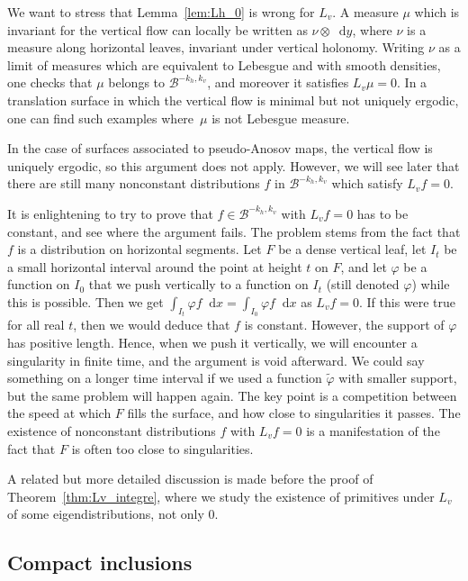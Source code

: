 \documentclass[10pt]{amsart}
\newcommand{\boB}{\mathcal{B}}
\newcommand{\dd}{\mathop{}\!\mathrm{d}}
\let\phi\varphi
\theoremstyle{definition}
\numberwithin{equation}{section}
\begin{document}
We want to stress that Lemma~\ref{lem:Lh_0} is wrong for $L_v$. A measure
$\mu$ which is invariant for the vertical flow can locally be written as
$\nu\otimes \dd y$, where $\nu$ is a measure along horizontal leaves,
invariant under vertical holonomy. Writing $\nu$ as a limit of measures which
are equivalent to Lebesgue and with smooth densities, one checks that $\mu$
belongs to $\boB^{-k_h, k_v}$, and moreover it satisfies $L_v \mu=0$. In a
translation surface in which the vertical flow is minimal but not uniquely
ergodic, one can find such examples where~$\mu$ is not Lebesgue measure.

In the case of surfaces associated to pseudo-Anosov maps, the vertical flow
is uniquely ergodic, so this argument does not apply. However, we will
see later that there are still many nonconstant distributions $f$ in
$\boB^{-k_h, k_v}$ which satisfy $L_v f = 0$.

It is enlightening to try to prove that $f\in \boB^{-k_h, k_v}$ with $L_v f =
0$ has to be constant, and see where the argument fails. The problem stems
from the fact that $f$ is a distribution on horizontal segments. Let $F$ be a
dense vertical leaf, let $I_t$ be a small horizontal interval around the
point at height $t$ on $F$, and let $\phi$ be a function on $I_0$ that we
push vertically to a function on $I_t$ (still denoted $\phi$) while this is
possible. Then we get $\int_{I_t} \phi f \dd x = \int_{I_0} \phi f \dd x$ as
$L_v f= 0$. If this were true for all real $t$, then we would deduce that $f$
is constant. However, the support of $\phi$ has positive length. Hence, when
we push it vertically, we will encounter a singularity in finite time, and
the argument is void afterward. We could say something on a longer time
interval if we used a function $\tilde\phi$ with smaller support, but the
same problem will happen again. The key point is a competition between the
speed at which $F$ fills the surface, and how close to singularities it
passes. The existence of nonconstant distributions $f$ with $L_v f = 0$ is a
manifestation of the fact that $F$ is often too close to singularities.

A related but more detailed discussion is made before the proof of
Theorem~\ref{thm:Lv_integre}, where we study the existence of primitives
under $L_v$ of some eigendistributions, not only $0$.

\subsection{Compact inclusions}
\end{document}
